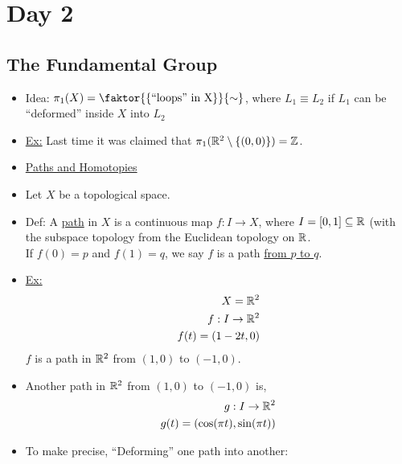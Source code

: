 \section{Day 2}
\subsection{The Fundamental Group}
    \begin{itemize}
        \item Idea: $\pi_1(X)=\faktor{\{\text{``loops'' in X}\}}{\sim}$, where $L_1 \equiv L_2$ if $L_1$ can be ``deformed'' inside $X$
            into $L_2$
        \item \underline{Ex:} Last time it was claimed that $\pi_1(\mathbb{R}^2\setminus \{(0,0)\})=\mathbb{Z}$.
        \item\underline{Paths and Homotopies}
        \item Let $X$ be a topological space.
        \item Def: A \underline{path} in $X$ is a continuous map $f:I \rightarrow X$, where $I=[0,1]\subseteq \mathbb{R}$ (with the
            subspace topology from the Euclidean topology on $\mathbb{R}$.\\
            If $f(0)=p$ and $f(1)=q$, we say $f$ is a path \underline{from $p$ to $q$}.
        \item \underline{Ex:}
            \begin{align*}
                X=\mathbb{R}^2\\
                f: I \rightarrow\mathbb{R}^2\\
                f(t)=(1-2t,0)\\
            \end{align*}
            $f$ is a path in $\mathbb{R}^2$ from $(1,0)$ to $(-1,0)$.
        \item Another path in $\mathbb{R}^2$ from $(1,0)$ to $(-1,0)$ is,
            \begin{align*}
                g: I \rightarrow \mathbb{R}^2\\
                g(t)=(\cos(\pi t),\sin(\pi t))\\
            \end{align*}
        \item To make precise, ``Deforming'' one path into another:\\
            \begin{minipage}[c]{\linewidth}
                \begin{center}

\end{center}
\end{minipage}
\end{itemize}
